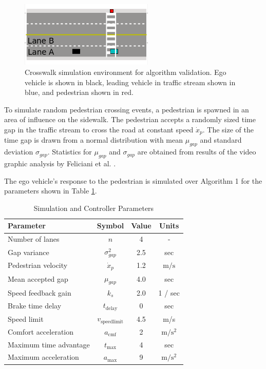 \documentclass[letterpaper, 10 pt, conference]{ieeeconf}  %
\begin{document}
\begin{figure}
\centering
\includegraphics[width=2.5in]{figures/simFramework.png}
\caption{Crosswalk simulation environment for algorithm validation. Ego vehicle is shown in black, leading vehicle in traffic stream shown in blue, and pedestrian shown in red.}
\label{fig:simFramework}
\end{figure}

To simulate random pedestrian crossing events, a pedestrian is spawned in an area of influence on the sidewalk. The pedestrian accepts a randomly sized time gap in the traffic stream to cross the road at constant speed $\dot{x}_p$. The size of the time gap is drawn from a normal distribution with mean $\mu_{gap}$ and standard deviation $\sigma_{gap}$. Statistics for $\mu_{gap}$ and $\sigma_{gap}$ are obtained from results of the video graphic analysis by Feliciani et al. \cite{Feliciani2017}. 

The ego vehicle's response to the pedestrian is simulated over Algorithm 1 for the parameters shown in Table \ref{tb:params}.  

\begin{table}[h]
\footnotesize
\begin{center}
\caption{Simulation and Controller Parameters}\label{tb:params}
\begin{tabular}{lccc}
Parameter & Symbol & Value & Units \\\hline\hline
Number of lanes & $n$ & 4 & - \\
Gap variance & $\sigma^2_{gap}$ & 2.5 & sec\\
Pedestrian velocity & $\dot{x}_p$ & 1.2 & $\mathrm{m/s}$ \\
Mean accepted gap & $\mu_{gap}$ & 4.0 & sec\\\hline
Speed feedback gain & $k_s$ & 2.0 & 1 / sec\\
Brake time delay    & $t_\mathrm{delay}$ & 0 & sec \\ 
Speed limit & $v_\mathrm{speedlimit}$ & 4.5 & m/s \\
Comfort acceleration & $a_\mathrm{cmf}$ & 2 & $\mathrm{m/s^2}$ \\
Maximum time advantage & $t_\mathrm{max}$ & 4 & sec \\
Maximum acceleration & $a_\mathrm{max}$ & 9 & $\mathrm{m/s^2}$ \\\hline
\end{tabular}
\end{center}
\end{table}
\end{document}

